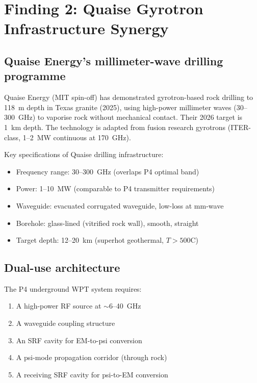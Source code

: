 \documentclass[11pt]{article}
\begin{document}
\section{Finding 2: Quaise Gyrotron Infrastructure Synergy}
\label{sec:quaise}

\subsection{Quaise Energy's millimeter-wave drilling programme}

Quaise Energy (MIT spin-off) has demonstrated gyrotron-based rock drilling
to 118~m depth in Texas granite (2025), using high-power millimeter waves
(30--300~GHz) to vaporise rock without mechanical contact. Their 2026 target
is 1~km depth. The technology is adapted from fusion research gyrotrons
(ITER-class, 1--2~MW continuous at 170~GHz).

Key specifications of Quaise drilling infrastructure:
\begin{itemize}[nosep]
\item Frequency range: 30--300~GHz (overlaps P4 optimal band)
\item Power: 1--10~MW (comparable to P4 transmitter requirements)
\item Waveguide: evacuated corrugated waveguide, low-loss at mm-wave
\item Borehole: glass-lined (vitrified rock wall), smooth, straight
\item Target depth: 12--20~km (superhot geothermal, $T > 500$\textdegree C)
\end{itemize}

\subsection{Dual-use architecture}

The P4 underground WPT system requires:
\begin{enumerate}[nosep]
\item A high-power RF source at $\sim$6--40~GHz
\item A waveguide coupling structure
\item An SRF cavity for EM-to-psi conversion
\item A psi-mode propagation corridor (through rock)
\item A receiving SRF cavity for psi-to-EM conversion
\end{enumerate}
\end{document}
